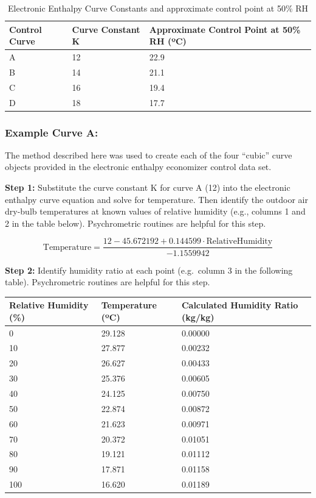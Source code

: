 \begin{longtable}[c]{p{1.5in}p{1.5in}p{3.0in}}
\caption{Electronic Enthalpy Curve Constants and approximate control point at 50\% RH \protect \label{table:electronic-enthalpy-curve-constants}}\\
\toprule 
Control Curve & Curve Constant K & Approximate Control Point at 50\% RH (ºC) \tabularnewline \midrule
\endhead
A & 12 & 22.9 \tabularnewline
B & 14 & 21.1 \tabularnewline
C & 16 & 19.4 \tabularnewline
D & 18 & 17.7 \tabularnewline
\bottomrule
\end{longtable}

\subsubsection{Example Curve A:}\label{example-curve-a}

The method described here was used to create each of the four ``cubic'' curve objects provided in the electronic enthalpy economizer control data set.

\textbf{Step 1:} Substitute the curve constant K for curve A (12) into the electronic enthalpy curve equation and solve for temperature. Then identify the outdoor air dry-bulb temperatures at known values of relative humidity (e.g., columns 1 and 2 in the table below). Psychrometric routines are helpful for this step.

\begin{equation}
\text{Temperature} = \frac{12 - 45.672192 + 0.144599 \cdot \text{RelativeHumidity}}{-1.1559942}
\end{equation}

\textbf{Step 2:} Identify humidity ratio at each point (e.g.~column 3 in the following table). Psychrometric routines are helpful for this step.

\begin{longtable}[c]{p{1.78in}p{1.5in}p{2.71in}}
\toprule 
Relative Humidity (\%) & Temperature (ºC) & Calculated Humidity Ratio (kg/kg) \tabularnewline \midrule
\endhead
0 & 29.128 & 0.00000 \tabularnewline
10 & 27.877 & 0.00232 \tabularnewline
20 & 26.627 & 0.00433 \tabularnewline
30 & 25.376 & 0.00605 \tabularnewline
40 & 24.125 & 0.00750 \tabularnewline
50 & 22.874 & 0.00872 \tabularnewline
60 & 21.623 & 0.00971 \tabularnewline
70 & 20.372 & 0.01051 \tabularnewline
80 & 19.121 & 0.01112 \tabularnewline
90 & 17.871 & 0.01158 \tabularnewline
100 & 16.620 & 0.01189 \tabularnewline
\bottomrule
\end{longtable}

